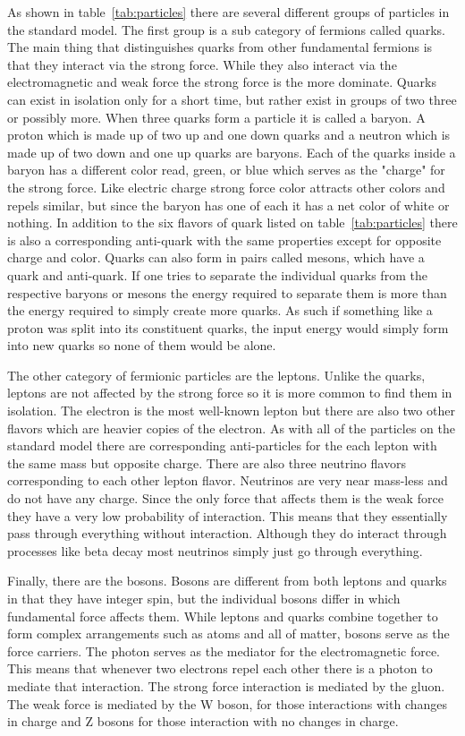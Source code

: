 As shown in table~\ref{tab:particles} there are several different groups of particles in the standard model. The first group is a sub category of fermions called quarks. The main thing that distinguishes quarks from other fundamental fermions is that they interact via the strong force. While they also interact via the electromagnetic and weak force the strong force is the more dominate. Quarks can exist in isolation only for a short time, but rather exist in groups of two three or possibly more. When three quarks form a particle it is called a baryon. A proton which is made up of two up and one down quarks and a neutron which is made up of two down and one up quarks are baryons. Each of the quarks inside a baryon has a different color read, green, or blue which serves as the "charge" for the strong force. Like electric charge strong force color attracts other colors and repels similar, but since the baryon has one of each it has a net color of white or nothing. In addition to the six flavors of quark listed on table~\ref{tab:particles} there is also a corresponding anti-quark with the same properties except for opposite charge and color. Quarks can also form in pairs called mesons, which have a quark and anti-quark. If one tries to separate the individual quarks from the respective baryons or mesons the energy required to separate them is more than the energy required to simply create more quarks. As such if something like a proton was split into its constituent quarks, the input energy would simply form into new quarks so none of them would be alone. 

The other category of fermionic particles are the leptons. Unlike the quarks, leptons are not affected by the strong force so it is more common to find them in isolation. The electron is the most well-known lepton but there are also two other flavors which are heavier copies of the electron. As with all of the particles on the standard model there are corresponding anti-particles for the each lepton with the same mass but opposite charge. There are also three neutrino flavors corresponding to each other lepton flavor. Neutrinos are very near mass-less and do not have any charge. Since the only force that affects them is the weak force they have a very low probability of interaction. This means that they essentially pass through everything without interaction. Although they do interact through processes like beta decay most neutrinos simply just go through everything. 

Finally, there are the bosons. Bosons are different from both leptons and quarks in that they have integer spin, but the individual bosons differ in which fundamental force affects them. While leptons and quarks combine together to form complex arrangements such as atoms and all of matter, bosons serve as the force carriers. The photon serves as the mediator for the electromagnetic force. This means that whenever two electrons repel each other there is a photon to mediate that interaction. The strong force interaction is mediated by the gluon. The weak force is mediated by the W boson, for those interactions with changes in charge and Z bosons for those interaction with no changes in charge. 


